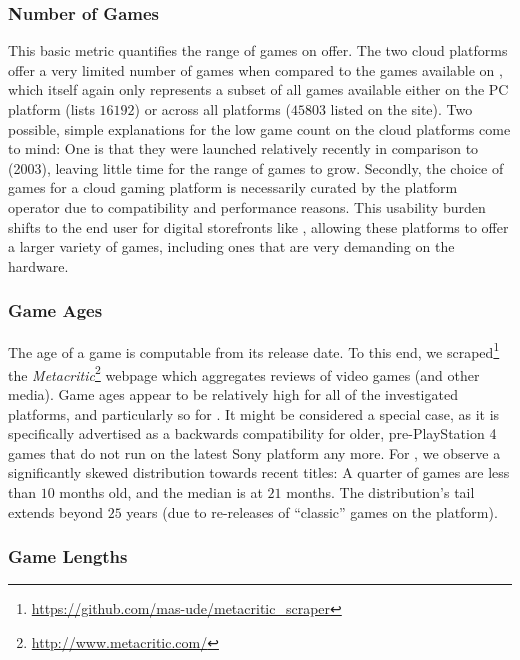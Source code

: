 \subsubsection{Number of Games}

This basic metric quantifies the range of games on offer. The two cloud platforms offer a very limited number of games when compared to the games available on \steam, which itself again only represents a subset of all games available either on the PC platform (\metacritic lists $16192$) or across all platforms ($45803$ listed on the site). Two possible, simple explanations for the low game count on the cloud platforms come to mind: One is that they were launched relatively recently in comparison to \steam (2003), leaving little time for the range of games to grow. Secondly, the choice of games for a cloud gaming platform is necessarily curated by the platform operator due to compatibility and performance reasons. This usability burden shifts to the end user for digital storefronts like \steam, allowing these platforms to offer a larger variety of games, including ones that are very demanding on the hardware.


\subsubsection{Game Ages}

The age of a game is computable from its release date. To this end, we scraped\footnote{\url{https://github.com/mas-ude/metacritic_scraper}} the \textit{Metacritic}\footnote{\url{http://www.metacritic.com/}} webpage which aggregates reviews of video games (and other media). Game ages appear to be relatively high for all of the investigated platforms, and particularly so for \psnow. It might be considered a special case, as it is specifically advertised as a backwards compatibility for older, pre-PlayStation 4 games that do not run on the latest Sony platform any more. For \steam, we observe a significantly skewed distribution towards recent titles: A quarter of games are less than $10$ months old, and the median is at $21$ months. The distribution's tail extends beyond $25$ years (due to re-releases of ``classic'' games on the platform).


\subsubsection{Game Lengths}

